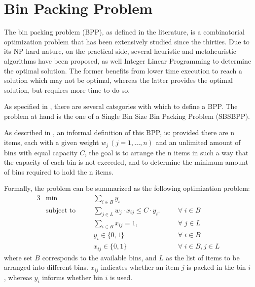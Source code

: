 \chapter{Bin Packing Problem} \label{chap:literature review}

The bin packing problem (BPP), as defined in the literature, is a combinatorial
optimization problem that has been extensively studied since the thirties. Due
to its NP-hard nature, on the practical side, several heuristic and
metaheuristic algorithms have been proposed, as well Integer Linear Programming
to determine the optimal solution. The former benefits from lower time execution
to reach a solution which may not be optimal, whereas the latter provides the
optimal solution, but requires more time to do so.

As specified in \cite{wascher2007improved}, there are several categories with
which to define a BPP. The problem at hand is the one of a Single Bin Size Bin
Packing Problem (SBSBPP).

As described in \cite{delorme2016bin}, an informal definition of this BPP, is:
provided there are n items, each with a given weight \( w_j  \, (j = 1, ..., n)
\) and an unlimited amount of bins with equal capacity \( C \), the goal is to
arrange the n items in such a way that the capacity of each bin is not exceeded,
and to determine the minimum amount of bins required to hold the n items.

Formally, the problem can be summarized as the following optimization problem:
\begin{alignat}{3}
    &\min       
        &&\sum_{i \in B} y_i 
            && \\
    &\text{subject to} \quad
        && \sum_{j \in L} w_j \cdot x_{ij} \leq C \cdot y_i. \quad      
            && \forall \; i \in B \label{opt:c1} \\
    &   && \sum_{i \in B} x_{ij} = 1, \quad                 
            && \forall \; j \in L \label{opt:c2} \\
    &   && y_i \in \{0, 1\}                                 
            && \forall \; i \in B \\
    &   && x_{ij} \in \{0,1\}                               
            && \forall \; i \in B, j \in L
\end{alignat}
where set $B$ corresponds to the available bins, and $L$ as the list of items to
be arranged into different bins. $x_{ij}$ indicates whether an item $j$ is
packed in the bin $i$, whereas $y_i$ informs whether bin $i$ is used. 

